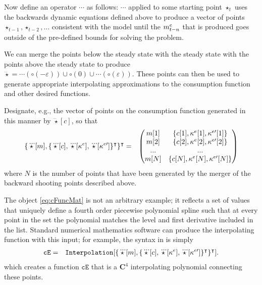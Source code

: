 \message{ !name(TractableBufferStock.tex)}\documentclass{handout}
\begin{document}
Now define an operator $\cdots$ as follows: $\cdots$ applied to some
starting point $\star_{t}$ uses the backwards dynamic equations
defined above to produce a vector of points
$\star_{t-1},\star_{t-2},...$ consistent with the model until the
$m^{e}_{t-n}$ that is produced goes outside of the pre-defined bounds
for solving the problem.

We can merge the points below the steady state with the steady state
with the points above the steady state to produce $\dddot{\star} =
\cdots(\pmb{\circ}(-\varepsilon)) \cup \pmb{\circ}(0) \cup
\cdots(\pmb{\circ}(\varepsilon)) $.  These points can then be used to
generate appropriate interpolating approximations to the consumption
function and other desired functions.

Designate, e.g., the vector of points on the consumption function
generated in this manner by $\dddot{\star}[c]$, so that 
\begin{eqnarray}
   \{\dddot{\star}[m],\{\dddot{\star}[c],\dddot{\star}[\kappa^{e}],\dddot{\star}[\kappa^{e\prime}]\}^{\intercal}\}^{\intercal} & = & 
\begin{pmatrix}
m[1] & \{c[1],\kappa^{e}[1],\kappa^{e\prime}[1]\} \\
m[2] & \{c[2],\kappa^{e}[2],\kappa^{e\prime}[2]\} \\
...  & ...              \\
m[N] & \{c[N],\kappa^{e}[N],\kappa^{e\prime}[N]\} \\
\end{pmatrix} \label{eq:cFuncMat}
\end{eqnarray}
where $N$ is the number of points that have been generated by the merger of the backward
shooting points described above.  

The object \eqref{eq:cFuncMat} is not an arbitrary example; it reflects a set of values that 
uniquely define a fourth order piecewise polynomial spline such that at every point in the 
set the polynomial matches the level and first derivative included in the list.  Standard
numerical mathematics software can produce the interpolating function with this input; 
for example, the syntax in \Mma is simply
\begin{eqnarray}
  \mathtt{cE} & = & \mathtt{Interpolation}[\{\dddot{\star}[m],\{\dddot{\star}[c],\dddot{\star}[\kappa^{e}],\dddot{\star}[\kappa^{e\prime}]\}^{\intercal}\}^{\intercal}].
\end{eqnarray}
which creates a function $\texttt{cE}$ that is a $\mathbf{C}^4$ interpolating polynomial
connecting these points.
\end{document}
